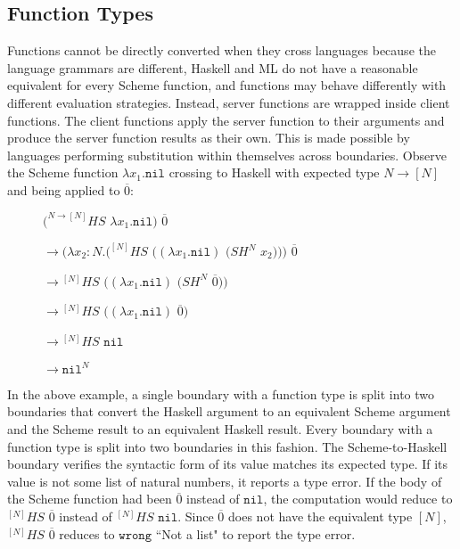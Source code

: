 \subsection{Function Types}

Functions cannot be directly converted when they cross languages because the language grammars are different, Haskell and ML do not have a reasonable equivalent for every Scheme function, and functions may behave differently with different evaluation strategies.  Instead, server functions are wrapped inside client functions.  The client functions apply the server function to their arguments and produce the server function results as their own.  This is made possible by languages performing substitution within themselves across boundaries.  Observe the Scheme function $\lambda x_{1}.\mathtt{nil}$ crossing to Haskell with expected type $N\rightarrow[N]$ and being applied to $\overline{0}$:

\begin{figure}[h]
$(^{N\rightarrow[N]}HS$ $\lambda x_{1}.\mathtt{nil})$ $\overline{0}$

\vspace{5pt}

$\rightarrow(\lambda x_{2}:N.(^{[N]}HS$ $((\lambda x_{1}.\mathtt{nil})$ $(SH^{N}$ $x_{2})))$ $\overline{0}$

\vspace{5pt}

$\rightarrow{^{[N]}H}S$ $((\lambda x_{1}.\mathtt{nil})$ $(SH^{N}$ $\overline{0}))$

\vspace{5pt}

$\rightarrow{^{[N]}H}S$ $((\lambda x_{1}.\mathtt{nil})$ $\overline{0})$

\vspace{5pt}

$\rightarrow{^{[N]}H}S$ $\mathtt{nil}$

\vspace{5pt}

$\rightarrow\mathtt{nil}^{N}$
\end{figure}

In the above example, a single boundary with a function type is split into two boundaries that convert the Haskell argument to an equivalent Scheme argument and the Scheme result to an equivalent Haskell result.  Every boundary with a function type is split into two boundaries in this fashion.  The Scheme-to-Haskell boundary verifies the syntactic form of its value matches its expected type.  If its value is not some list of natural numbers, it reports a type error.  If the body of the Scheme function had been $\overline{0}$ instead of $\mathtt{nil}$, the computation would reduce to $^{[N]}HS$ $\overline{0}$ instead of $^{[N]}HS$ $\mathtt{nil}$.  Since $\overline{0}$ does not have the equivalent type $[N]$, $^{[N]}HS$ $\overline{0}$ reduces to $\mathtt{wrong}$ ``Not a list" to report the type error.

